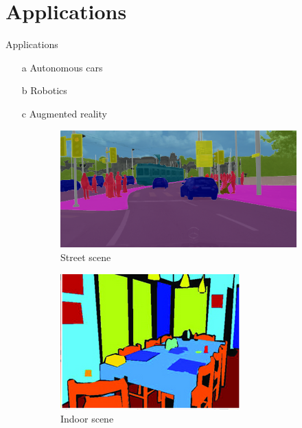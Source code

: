 \documentclass{beamer}
\begin{document}
\section{Applications}
\begin{frame}{Applications}
	\begin{itemize}
  \item[a] {
    Autonomous cars
  }
  \item[b] {
    Robotics
  }
  \item[c] {
    Augmented reality
  }
  \end{itemize}
  
  \begin{figure}
		\begin{subfigure}{0.3\textwidth}
			\centering
			\includegraphics[width=0.95\linewidth]{images/auto_driving}
			\caption{Street scene}
		\end{subfigure}
		\begin{subfigure}{0.3\textwidth}
			\centering
			\includegraphics[width=0.8\linewidth]{images/indoor}
			\caption{Indoor scene}
		\end{subfigure}
		\begin{subfigure}{0.3\textwidth}

\end{subfigure}
\end{figure}
\end{frame}
\end{document}
